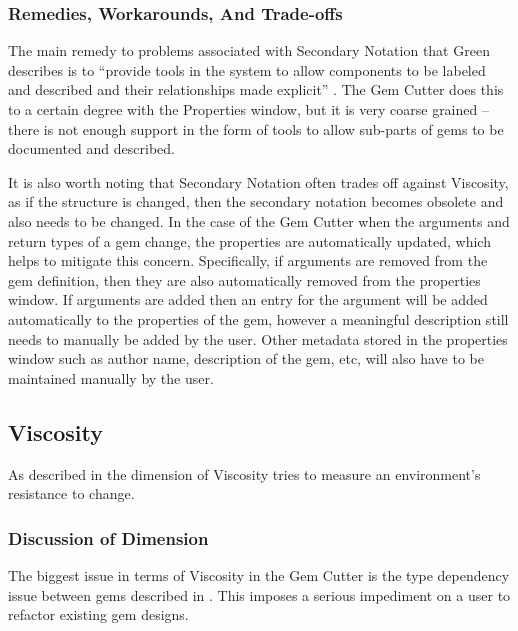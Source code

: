 \subsubsection{Remedies, Workarounds, And Trade-offs}

The main remedy to problems associated with Secondary Notation that Green describes is to ``provide tools in the system to allow components to be labeled and described and their relationships made explicit'' \cite{green98}.  The Gem Cutter does this to a certain degree with the Properties window, but it is very coarse grained -- there is not enough support in the form of tools to allow sub-parts of gems to be documented and described.

It is also worth noting that Secondary Notation often trades off against Viscosity, as if the structure is changed, then the secondary notation becomes obsolete and also needs to be changed.  In the case of the Gem Cutter when the arguments and return types of a gem change, the properties are automatically updated, which helps to mitigate this concern.  Specifically, if arguments are removed from the gem definition, then they are also automatically removed from the properties window.  If arguments are added then an entry for the argument will be added automatically to the properties of the gem, however a meaningful description still needs to manually be added by the user.  Other metadata stored in the properties window such as author name, description of the gem, etc, will also have to be maintained manually by the user.


\subsection{Viscosity}

As described in  the dimension of Viscosity tries to measure an environment's resistance to change.

\subsubsection{Discussion of Dimension}

The biggest issue in terms of Viscosity in the Gem Cutter is the type dependency issue between gems described in .  This imposes a serious impediment on a user to refactor existing gem designs.

